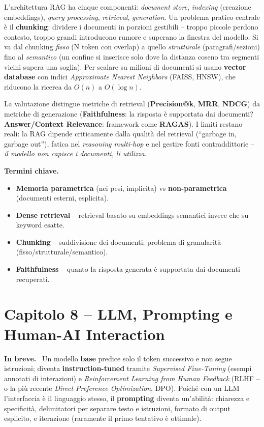 \documentclass[11pt,a4paper]{article}
\newcommand{\spiega}{\medskip\noindent\textbf{\textcolor{blue!45!black}{In breve.}}\ }
\newcommand{\termini}{\medskip\noindent\textbf{\textcolor{blue!45!black}{Termini chiave.}}}
\begin{document}
L'architettura RAG ha cinque componenti: \emph{document store}, \emph{indexing} (creazione embeddings), \emph{query processing}, \emph{retrieval}, \emph{generation}. Un problema pratico centrale \`e il \textbf{chunking}: dividere i documenti in porzioni gestibili -- troppo piccole perdono contesto, troppo grandi introducono rumore e superano la finestra del modello. Si va dal chunking \emph{fisso} (N token con overlap) a quello \emph{strutturale} (paragrafi/sezioni) fino al \emph{semantico} (un confine si inserisce solo dove la distanza coseno tra segmenti vicini supera una soglia). Per scalare su milioni di documenti si usano \textbf{vector database} con indici \emph{Approximate Nearest Neighbors} (FAISS, HNSW), che riducono la ricerca da $O(n)$ a $O(\log n)$.

La valutazione distingue metriche di retrieval (\textbf{Precision@k}, \textbf{MRR}, \textbf{NDCG}) da metriche di generazione (\textbf{Faithfulness}: la risposta \`e supportata dai documenti? \textbf{Answer/Context Relevance}: framework come \textbf{RAGAS}). I limiti restano reali: la RAG dipende criticamente dalla qualit\`a del retrieval (``garbage in, garbage out''), fatica nel \emph{reasoning multi-hop} e nel gestire fonti contraddittorie -- \emph{il modello non capisce i documenti, li utilizza}.

\termini
\begin{itemize}
\item \textbf{Memoria parametrica} (nei pesi, implicita) vs \textbf{non-parametrica} (documenti esterni, esplicita).
\item \textbf{Dense retrieval} -- retrieval basato su embeddings semantici invece che su keyword esatte.
\item \textbf{Chunking} -- suddivisione dei documenti; problema di granularit\`a (fisso/strutturale/semantico).
\item \textbf{Faithfulness} -- quanto la risposta generata \`e supportata dai documenti recuperati.
\end{itemize}

\section*{Capitolo 8 -- LLM, Prompting e Human-AI Interaction}

\spiega
Un modello \textbf{base} predice solo il token successivo e non segue istruzioni; diventa \textbf{instruction-tuned} tramite \emph{Supervised Fine-Tuning} (esempi annotati di interazioni) e \emph{Reinforcement Learning from Human Feedback} (RLHF -- o la pi\`u recente \emph{Direct Preference Optimization}, DPO). Poich\'e con un LLM l'interfaccia \`e il linguaggio stesso, il \textbf{prompting} diventa un'abilit\`a: chiarezza e specificit\`a, delimitatori per separare testo e istruzioni, formato di output esplicito, e iterazione (raramente il primo tentativo \`e ottimale).
\end{document}
